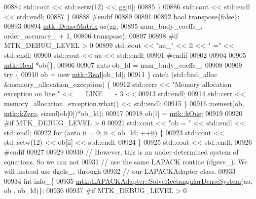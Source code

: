 \begin{DoxyCode}
{{00884         std::cout << std::setw(12) << gg[ii];
00885       \}
00886       std::cout << std::endl << std::endl;
00887     \}
00888 \textcolor{preprocessor}{    #endif}
00889 
00891 
00892     \textcolor{keywordtype}{bool} transpose\{\textcolor{keyword}{false}\};
00893 
00894     \hyperlink{classmtk_1_1DenseMatrix}{mtk::DenseMatrix} aa(gg,
00895                          num\_bndy\_coeffs\_, order\_accuracy\_ + 1,
00896                          transpose);
00897 
00898 \textcolor{preprocessor}{    #if MTK\_DEBUG\_LEVEL > 0}
00899     std::cout << \textcolor{stringliteral}{"aa\_"} << ll << \textcolor{stringliteral}{" ="} << std::endl;
00900     std::cout << aa << std::endl;
00901 \textcolor{preprocessor}{    #endif}
00902 
00904 
00905     \hyperlink{group__c01-roots_gac080bbbf5cbb5502c9f00405f894857d}{mtk::Real} *ob\{\};
00906 
00907     \textcolor{keyword}{auto} ob\_ld = num\_bndy\_coeffs\_;
00908 
00909     \textcolor{keywordflow}{try} \{
00910       ob = \textcolor{keyword}{new} \hyperlink{group__c01-roots_gac080bbbf5cbb5502c9f00405f894857d}{mtk::Real}[ob\_ld];
00911     \} \textcolor{keywordflow}{catch} (std::bad\_alloc &memory\_allocation\_exception) \{
00912       std::cerr << \textcolor{stringliteral}{"Memory allocation exception on line "} << \_\_LINE\_\_ - 3 <<
00913         std::endl;
00914       std::cerr << memory\_allocation\_exception.what() << std::endl;
00915     \}
00916     memset(ob, \hyperlink{group__c01-roots_ga59a451a5fae30d59649bcda274fea271}{mtk::kZero}, \textcolor{keyword}{sizeof}(ob[0])*ob\_ld);
00917 
00918     ob[1] = \hyperlink{group__c01-roots_ga26407c24d43b6b95480943340d285c71}{mtk::kOne};
00919 
00920 \textcolor{preprocessor}{    #if MTK\_DEBUG\_LEVEL > 0}
00921     std::cout << \textcolor{stringliteral}{"ob = "} << std::endl << std::endl;
00922     \textcolor{keywordflow}{for} (\textcolor{keyword}{auto} ii = 0; ii < ob\_ld; ++ii) \{
00923       std::cout << std::setw(12) << ob[ii] << std::endl;
00924     \}
00925     std::cout << std::endl;
00926 \textcolor{preprocessor}{    #endif}
00927 
00929 
00930     \textcolor{comment}{// However, this is an under-determined system of equations. So we can not}
00931     \textcolor{comment}{// use the same LAPACK routine (dgesv\_). We will instead use dgels\_, through}
00932     \textcolor{comment}{// our LAPACKAdapter class.}
00933 
00934     \textcolor{keywordtype}{int} info\_\{
00935       \hyperlink{classmtk_1_1LAPACKAdapter_a380f148ffdf96bae2f79ae28f1a6560c}{mtk::LAPACKAdapter::SolveRectangularDenseSystem}(aa, ob
      , ob\_ld)\};
00936 
00937 \textcolor{preprocessor}{    #if MTK\_DEBUG\_LEVEL > 0}
}}
\end{DoxyCode}
